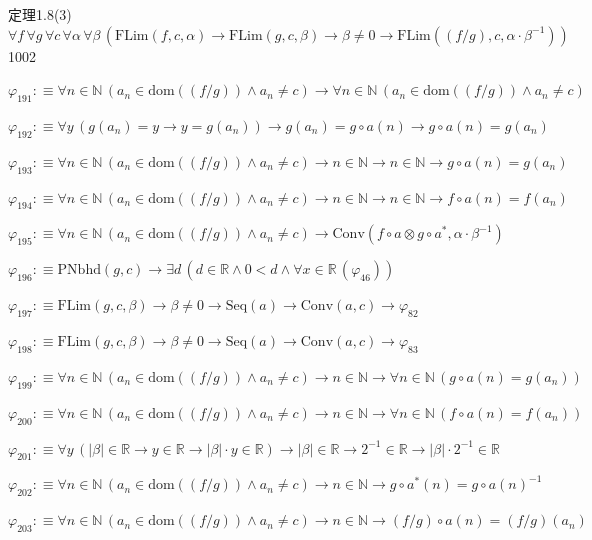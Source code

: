 \begin{fullproof}{定理1.8(3)}{$\forall f\,\forall g\,\forall c\,\forall \alpha\,\forall \beta\,(\mathrm{FLim}(f,c,\alpha) \to \mathrm{FLim}(g,c,\beta) \to \beta \neq 0 \to \mathrm{FLim}((f / g),c,\alpha \cdot \beta^{-1}))$}{1002}
\begin{abbrevlist}
\item $\varphi_{191} :\equiv \forall n \in \mathbb{N}\,(a_{n} \in \mathrm{dom}((f / g)) \land a_{n} \neq c) \to \forall n \in \mathbb{N}\,(a_{n} \in \mathrm{dom}((f / g)) \land a_{n} \neq c)$
\item $\varphi_{192} :\equiv \forall y\,(g(a_{n}) = y \to y = g(a_{n})) \to g(a_{n}) = g \circ a(n) \to g \circ a(n) = g(a_{n})$
\item $\varphi_{193} :\equiv \forall n \in \mathbb{N}\,(a_{n} \in \mathrm{dom}((f / g)) \land a_{n} \neq c) \to n \in \mathbb{N} \to n \in \mathbb{N} \to g \circ a(n) = g(a_{n})$
\item $\varphi_{194} :\equiv \forall n \in \mathbb{N}\,(a_{n} \in \mathrm{dom}((f / g)) \land a_{n} \neq c) \to n \in \mathbb{N} \to n \in \mathbb{N} \to f \circ a(n) = f(a_{n})$
\item $\varphi_{195} :\equiv \forall n \in \mathbb{N}\,(a_{n} \in \mathrm{dom}((f / g)) \land a_{n} \neq c) \to \mathrm{Conv}(f \circ a \otimes g \circ a^{\ast},\alpha \cdot \beta^{-1})$
\item $\varphi_{196} :\equiv \mathrm{PNbhd}(g,c) \to \exists d\,(d \in \mathbb{R} \land 0 < d \land \forall x \in \mathbb{R}\,(\varphi_{46}))$
\item $\varphi_{197} :\equiv \mathrm{FLim}(g,c,\beta) \to \beta \neq 0 \to \mathrm{Seq}(a) \to \mathrm{Conv}(a,c) \to \varphi_{82}$
\item $\varphi_{198} :\equiv \mathrm{FLim}(g,c,\beta) \to \beta \neq 0 \to \mathrm{Seq}(a) \to \mathrm{Conv}(a,c) \to \varphi_{83}$
\item $\varphi_{199} :\equiv \forall n \in \mathbb{N}\,(a_{n} \in \mathrm{dom}((f / g)) \land a_{n} \neq c) \to n \in \mathbb{N} \to \forall n \in \mathbb{N}\,(g \circ a(n) = g(a_{n}))$
\item $\varphi_{200} :\equiv \forall n \in \mathbb{N}\,(a_{n} \in \mathrm{dom}((f / g)) \land a_{n} \neq c) \to n \in \mathbb{N} \to \forall n \in \mathbb{N}\,(f \circ a(n) = f(a_{n}))$
\item $\varphi_{201} :\equiv \forall y\,(\lvert \beta \rvert \in \mathbb{R} \to y \in \mathbb{R} \to \lvert \beta \rvert \cdot y \in \mathbb{R}) \to \lvert \beta \rvert \in \mathbb{R} \to 2^{-1} \in \mathbb{R} \to \lvert \beta \rvert \cdot 2^{-1} \in \mathbb{R}$
\item $\varphi_{202} :\equiv \forall n \in \mathbb{N}\,(a_{n} \in \mathrm{dom}((f / g)) \land a_{n} \neq c) \to n \in \mathbb{N} \to g \circ a^{\ast}(n) = g \circ a(n)^{-1}$
\item $\varphi_{203} :\equiv \forall n \in \mathbb{N}\,(a_{n} \in \mathrm{dom}((f / g)) \land a_{n} \neq c) \to n \in \mathbb{N} \to (f / g) \circ a(n) = (f / g)(a_{n})$

\end{abbrevlist}
\end{fullproof}
